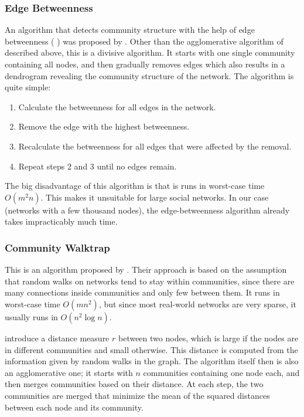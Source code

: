 \subsubsection{Edge Betweenness}
\label{ssst:edgebetweenness} An algorithm that detects community structure with the help of edge betweenness (%
) was proposed by \cite{Girvan_2002}. Other than the agglomerative algorithm of \cite{Clauset_2004} described above, this is a divisive algorithm. It starts with one single community containing all nodes, and then gradually removes edges which also results in a dendrogram revealing the community structure of the network. The algorithm is quite simple:

\begin{enumerate}
\item Calculate the betweenness for all edges in the network.
\item Remove the edge with the highest betweenness.
\item Recalculate the betweenness for all edges that were affected by the removal.
\item Repeat steps 2 and 3 until no edges remain.
\end{enumerate}

The big disadvantage of this algorithm is that is runs in worst-case time $O(m^2n)$. This makes it unsuitable for large social networks. In our case (networks with a few thousand nodes), the edge-betweenness algorithm already takes impracticably much time.

\subsubsection{Community Walktrap}
\label{ssst:communitywalktrap} This is an algorithm proposed by \cite{Pons_2005}. Their approach is based on the assumption that random walks on networks tend to stay within communities, since there are many connections inside communities and only few between them. It runs in worst-case time $O(m n^2)$, but since most real-world networks are very sparse, it usually runs in $O(n^2\log n)$.

\cite{Pons_2005} introduce a distance measure $r$ between two nodes, which is large if the nodes are in different communities and small otherwise. This distance is computed from the information given by random walks in the graph. The algorithm itself then is also an agglomerative one; it starts with $n$ communities containing one node each, and then merges communities based on their distance. At each step, the two communities are merged that minimize the mean of the squared distances between each node and its community.
